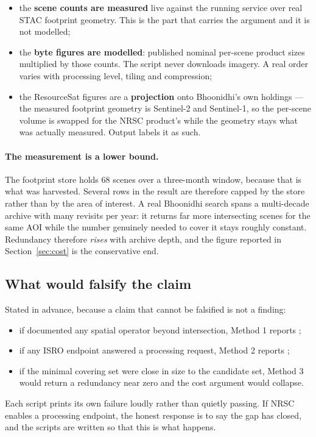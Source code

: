 \begin{itemize}
  \item the \textbf{scene counts are measured} live against the running
        service over real STAC footprint geometry. This is the part that
        carries the argument and it is not modelled;
  \item the \textbf{byte figures are modelled}: published nominal per-scene
        product sizes multiplied by those counts. The script never downloads
        imagery. A real order varies with processing level, tiling and
        compression;
  \item the ResourceSat figures are a \textbf{projection} onto Bhoonidhi's own
        holdings --- the measured footprint geometry is Sentinel-2 and
        Sentinel-1, so the per-scene volume is swapped for the NRSC product's
        while the geometry stays what was actually measured. Output labels it
        as such.
\end{itemize}

\paragraph{The measurement is a lower bound.} The footprint store holds 68
scenes over a three-month window, because that is what was harvested. Several
rows in the result are therefore capped by the store rather than by the area
of interest. A real Bhoonidhi search spans a multi-decade archive with many
revisits per year: it returns far more intersecting scenes for the same AOI
while the number genuinely needed to cover it stays roughly constant.
Redundancy therefore \emph{rises} with archive depth, and the figure reported
in Section~\ref{sec:cost} is the conservative end.

\subsection{What would falsify the claim}

Stated in advance, because a claim that cannot be falsified is not a finding:

\begin{itemize}
  \item if  documented any spatial operator beyond
        intersection, Method 1 reports ;
  \item if any ISRO endpoint answered a processing request, Method 2 reports
        ;
  \item if the minimal covering set were close in size to the candidate set,
        Method 3 would return a redundancy near zero and the cost argument
        would collapse.
\end{itemize}

Each script prints its own failure loudly rather than quietly passing. If
NRSC enables a processing endpoint, the honest response is to say the gap has
closed, and the scripts are written so that this is what happens.
